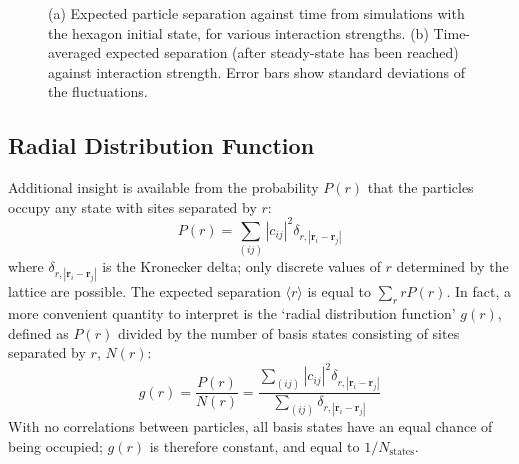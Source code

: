 \begin{figure}[ht]
    \centering
    \hfill
    \caption{(a) Expected particle separation against time from simulations with the hexagon initial state, for various interaction strengths. (b) Time-averaged expected separation (after steady-state has been reached) against interaction strength. Error bars show standard deviations of the fluctuations.}
    \label{Fig:ParticleSeparation}
\end{figure}

\subsection{Radial Distribution Function}

Additional insight is available from the probability $P(r)$ that the particles occupy any state with sites separated by $r$:
\begin{equation}
    P(r) = \sum_{(ij)}|c_{ij}|^2 \delta_{r,|\textbf{r}_i-\textbf{r}_j|}
\end{equation}
where $\delta_{r,|\textbf{r}_i-\textbf{r}_j|}$ is the Kronecker delta; only discrete values of $r$ determined by the lattice are possible. The expected separation $\langle r \rangle$ is equal to $\sum_r rP(r)$. In fact, a more convenient quantity to interpret is the `radial distribution function' $g(r)$, defined as $P(r)$ divided by the number of basis states consisting of sites separated by $r$, $N(r)$:
\begin{equation}
    g(r) = \frac{P(r)}{N(r)}=\frac{\sum_{(ij)}|c_{ij}|^2 \delta_{r,|\textbf{r}_i-\textbf{r}_j|}}{\sum_{(ij)}\delta_{r,|\textbf{r}_i-\textbf{r}_j|}}
\end{equation}
With no correlations between particles, all basis states have an equal chance of being occupied; $g(r)$ is therefore constant, and equal to $1/N_{\text{states}}$.

